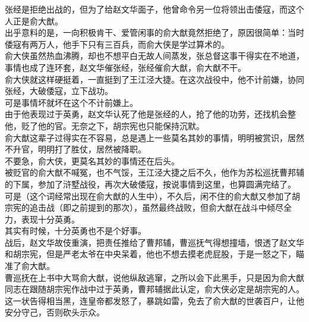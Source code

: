 \begin{multicols}{\theparacolNo}
张经是拒绝出战的，但为了给赵文华面子，他曾命令另一位将领出击倭寇，而这个人正是俞大猷。\\

出乎意料的是，一向积极肯干、爱管闲事的俞大猷竟然拒绝了，原因很简单：当时倭寇有两万人，他手下只有三百兵，而俞大侠是学过算术的。\\

俞大侠虽然热血沸腾，却也不想平白无故人间蒸发，张总督这事干得实在不地道，事情也成了连环套，赵文华催张经，张经催俞大猷，俞大猷不干。\\

俞大侠就这样硬挺着，一直挺到了王江泾大捷。在这次战役中，他不计前嫌，协同张经，大破倭寇，立下战功。\\

可是事情坏就坏在这个不计前嫌上。\\

由于他表现过于英勇，赵文华认死了他是张经的人，抢了他的功劳，还找机会整他，贬了他的官。无奈之下，胡宗宪也只能保持沉默。\\

俞大猷这辈子过得实在不容易，总是遇上一些莫名其妙的事情，明明被赏识，居然不升官，明明打了胜仗，居然被降职。\\

不要急，俞大侠，更莫名其妙的事情还在后头。\\

被贬官的俞大猷不喊冤，也不气馁，王江泾大捷之后不久，他作为苏松巡抚曹邦辅的下属，参加了浒墅战役，再次大破倭寇，按说事情到这里，也算圆满完结了。\\

可是（这个词经常出现在俞大猷的人生中），不久后，闲不住的俞大猷又参加了胡宗宪的追击战（即之前提到的那次），虽然最终战败，但俞大猷在战斗中倾尽全力，表现十分英勇。\\

其实有时候，十分英勇也不是个好事。\\

战后，赵文华故伎重演，把责任推给了曹邦辅，曹巡抚气得想撞墙，恨透了赵文华和胡宗宪，但是严老太爷在中央呆着，他也不想去摸老虎屁股，于是一怒之下，瞄准了俞大猷。\\

曹巡抚在上书中大骂俞大猷，说他纵敌逃窜，之所以会下此黑手，只是因为俞大猷同志在跟随胡宗宪作战中过于英勇，曹邦辅据此认定，俞大侠必定是胡宗宪的人。\\

这一状告得相当黑，连皇帝都发怒了，暴跳如雷，免去了俞大猷的世袭百户，让他安分守己，否则砍头示众。\\


\end{multicols}
